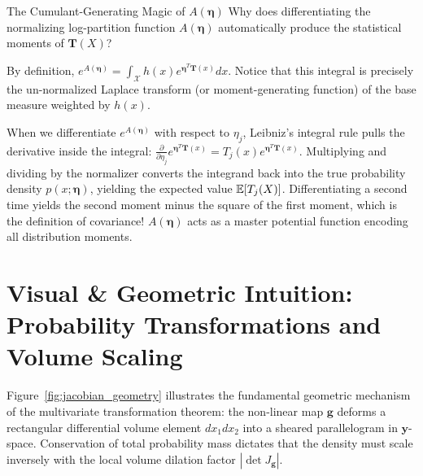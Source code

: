\begin{ponderbox}{The Cumulant-Generating Magic of $A(\boldsymbol{\eta})$}
Why does differentiating the normalizing log-partition function $A(\boldsymbol{\eta})$ automatically produce the statistical moments of $\mathbf{T}(X)$?

\tcblower
By definition, $e^{A(\boldsymbol{\eta})} = \int_{\mathcal{X}} h(x) e^{\boldsymbol{\eta}^T \mathbf{T}(x)} dx$. Notice that this integral is precisely the un-normalized Laplace transform (or moment-generating function) of the base measure weighted by $h(x)$.

When we differentiate $e^{A(\boldsymbol{\eta})}$ with respect to $\eta_j$, Leibniz's integral rule pulls the derivative inside the integral: $\frac{\partial}{\partial \eta_j} e^{\boldsymbol{\eta}^T \mathbf{T}(x)} = T_j(x) e^{\boldsymbol{\eta}^T \mathbf{T}(x)}$. Multiplying and dividing by the normalizer converts the integrand back into the true probability density $p(x; \boldsymbol{\eta})$, yielding the expected value $\operatorname{\mathbb{E}}[T_j(X)]$. Differentiating a second time yields the second moment minus the square of the first moment, which is the definition of covariance! $A(\boldsymbol{\eta})$ acts as a master potential function encoding all distribution moments.
\end{ponderbox}

\section{Visual \& Geometric Intuition: Probability Transformations and Volume Scaling}

Figure~\ref{fig:jacobian_geometry} illustrates the fundamental geometric mechanism of the multivariate transformation theorem: the non-linear map $\mathbf{g}$ deforms a rectangular differential volume element $dx_1 dx_2$ into a sheared parallelogram in $\mathbf{y}$-space. Conservation of total probability mass dictates that the density must scale inversely with the local volume dilation factor $|\det J_{\mathbf{g}}|$.

